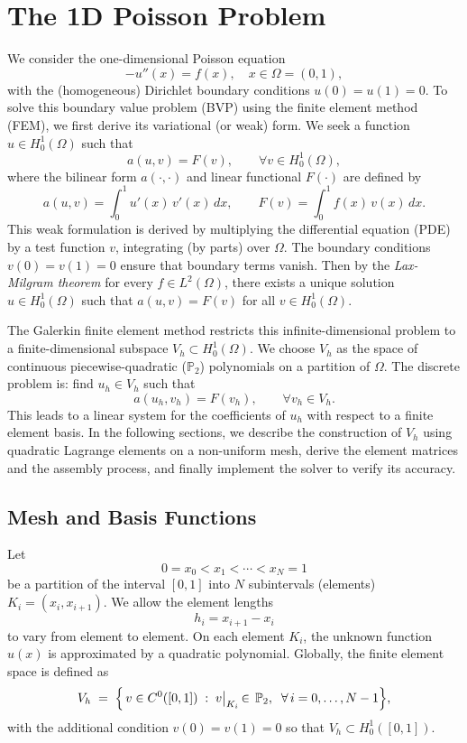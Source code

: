 \documentclass[a4paper,10pt]{article}
\begin{document}

\clearpage

\section{The 1D Poisson Problem}
We consider the one-dimensional Poisson equation
\[
	-u''(x) = f(x), \quad x \in \Omega=(0,1),
\]
with the (homogeneous) Dirichlet boundary conditions \(u(0)=u(1)=0\).
To solve this boundary value problem (BVP) using the finite element method (FEM), we first derive its variational (or weak) form.
We seek a function \(u \in H^1_0(\Omega)\) such that
\[
	a(u,v) = F(v), \qquad \forall v \in H^1_0(\Omega),
\]
where the bilinear form \(a(\cdot,\cdot)\) and linear functional \(F(\cdot)\) are defined by
\[
	a(u,v) = \int_0^1 u'(x)\,v'(x)\,dx, \qquad F(v) = \int_0^1 f(x)\,v(x)\,dx. \label{eq:weak_form}
\]
This weak formulation is derived by multiplying the differential equation (PDE) by a test function \(v\), integrating (by parts) over \(\Omega\).
The boundary conditions \(v(0)=v(1)=0\) ensure that boundary terms vanish. Then by the \emph{Lax-Milgram theorem} for every \(f \in L^2(\Omega)\), there exists a unique solution \(u \in H^1_0(\Omega)\) such that \(a(u,v)=F(v)\) for all \(v \in H^1_0(\Omega)\)\cite{lax_milgram_1954}.

The Galerkin finite element method restricts this infinite-dimensional problem to a finite-dimensional subspace \(V_h \subset H^1_0(\Omega)\). We choose \(V_h\) as the space of continuous piecewise-quadratic (\(\mathbb{P}_2\)) polynomials on a partition of \(\Omega\). The discrete problem is: find \(u_h \in V_h\) such that
\[
	a(u_h,v_h) = F(v_h), \qquad \forall v_h \in V_h.
\]
This leads to a linear system for the coefficients of \(u_h\) with respect to a finite element basis.
In the following sections, we describe the construction of \(V_h\) using quadratic Lagrange elements on a non-uniform mesh, derive the element matrices and the assembly process, and finally implement the solver to verify its accuracy.
\clearpage
\subsection{Mesh and Basis Functions}
Let
\[
	0 = x_0 < x_1 < \cdots < x_N = 1
\]
be a partition of the interval $[0,1]$ into $N$ subintervals (elements) $K_i = (x_i, x_{i+1})$. We allow the element lengths
\[
	h_i = x_{i+1} - x_i
\]
to vary from element to element. On each element $K_i$, the unknown function $u(x)$ is approximated by a quadratic polynomial. Globally, the finite element space is defined as
\[
	V_h \;=\; \Bigl\{\,v \in C^{0}([0,1])\;:\; v\bigl|_{K_i} \,\in\, \mathbb{P}_2,\;\; \forall\, i=0,\dots,N-1 \Bigr\},
\]
with the additional condition \(v(0)=v(1)=0\) so that \(V_h \subset H^1_0([0,1])\).
\end{document}
